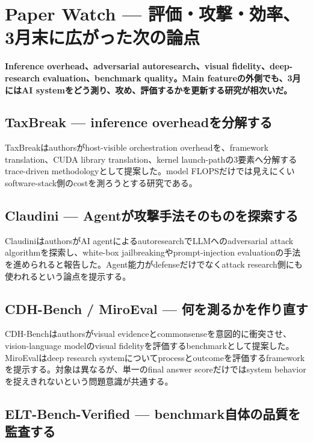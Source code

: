 \section{Paper Watch — 評価・攻撃・効率、3月末に広がった次の論点}
\noindent\textbf{Inference overhead、adversarial autoresearch、visual fidelity、deep-research evaluation、benchmark quality。Main featureの外側でも、3月にはAI systemをどう測り、攻め、評価するかを更新する研究が相次いだ。}\autocite{src-198727200361,src-4553a7bbd23e,src-5d84874f2d03,src-a27679e5527b,src-bb83c9c55568}

\subsection{TaxBreak — inference overheadを分解する}

TaxBreakはauthorsがhost-visible orchestration overheadを、framework translation、CUDA library translation、kernel launch-pathの3要素へ分解するtrace-driven methodologyとして提案した。model FLOPSだけでは見えにくいsoftware-stack側のcostを測ろうとする研究である。\autocite{src-198727200361}


\subsection{Claudini — Agentが攻撃手法そのものを探索する}

ClaudiniはauthorsがAI agentによるautoresearchでLLMへのadversarial attack algorithmを探索し、white-box jailbreakingやprompt-injection evaluationの手法を進められると報告した。Agent能力がdefenseだけでなくattack research側にも使われるという論点を提示する。\autocite{src-bb83c9c55568}


\subsection{CDH-Bench / MiroEval — 何を測るかを作り直す}

CDH-Benchはauthorsがvisual evidenceとcommonsenseを意図的に衝突させ、vision-language modelのvisual fidelityを評価するbenchmarkとして提案した。MiroEvalはdeep research systemについてprocessとoutcomeを評価するframeworkを提示する。対象は異なるが、単一のfinal answer scoreだけではsystem behaviorを捉えきれないという問題意識が共通する。\autocite{src-4553a7bbd23e,src-5d84874f2d03}


\subsection{ELT-Bench-Verified — benchmark自体の品質を監査する}

